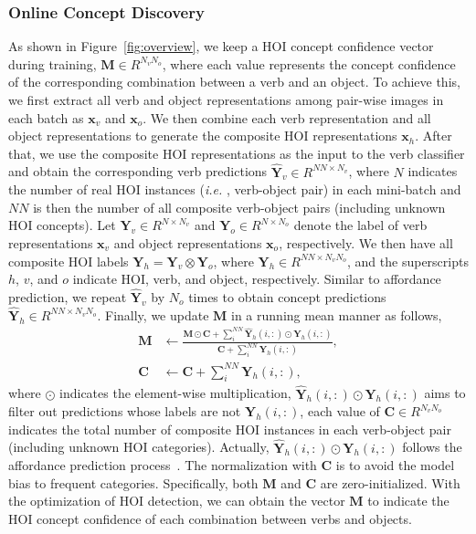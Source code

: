 \documentclass[runningheads]{llncs}
\newcommand{\ie}{\textit{i.e. }}
\begin{document}
\subsubsection{Online Concept Discovery}
 As shown in Figure~\ref{fig:overview}, we keep a HOI concept confidence vector during training, $\mathbf{M} \in R^{N_vN_o}$, where each value represents the concept confidence of the corresponding combination between a verb and an object. To achieve this, we first extract all verb and object representations among pair-wise images in each batch as $\mathbf{x}_v$ and $\mathbf{x}_o$. We then combine each verb representation and all object representations to generate the composite HOI representations $\mathbf{x}_{h}$. After that, we use the composite HOI representations as the input to the verb classifier and obtain the corresponding verb predictions $\mathbf{\hat{Y}}_v\in R^{NN\times N_v}$, where $N$ indicates the number of real HOI instances (\ie, verb-object pair) in each mini-batch and $NN$ is then the number of all composite verb-object pairs (including unknown HOI concepts). Let $\mathbf{Y}_v \in R^{N \times N_v}$ and $\mathbf{Y}_o \in R^{N \times N_o}$ denote the label of verb representations $\mathbf{x}_v$ and object representations $\mathbf{x}_o$, respectively. We then have all composite HOI labels $\mathbf{Y}_{h} = \mathbf{Y}_v \otimes \mathbf{Y}_o$, where $\mathbf{Y}_{h} \in R^{ N N\times N_v N_o}$, and the superscripts $h$, $v$, and $o$ indicate HOI, verb, and object, respectively. Similar to affordance prediction, we repeat $\mathbf{\hat{Y}}_v$ by $N_o$ times to obtain concept predictions $\mathbf{\hat{Y}}_{h} \in R^{N N \times N_v N_o}$. Finally, we update $\mathbf{M}$ in a running mean manner \cite{ioffe2015batch} as follows,
\begin{align}
    \mathbf{M} &\leftarrow \frac{\mathbf{M} \odot \mathbf{C} + \sum_{i}^{NN}{\mathbf{\hat{Y}}_{h}(i,:) \odot \mathbf{Y}_{h}(i,:)}}{\mathbf{C}+\sum_{i}^{NN}{\mathbf{Y}_{h}(i,:)}}, \\
    \mathbf{C} &\leftarrow \mathbf{C} + \sum_{i}^{NN}{\mathbf{Y}_{h}(i,:)},
\end{align}
where $\odot$ indicates the element-wise multiplication, $\mathbf{\hat{Y}}_{h}(i,:) \odot \mathbf{Y}_{h}(i,:)$ aims to filter out predictions whose labels are not $\mathbf{Y}_{h}(i,:)$, each value of $\mathbf{C} \in R^{N_v N_o}$ indicates the total number of composite HOI instances in each verb-object pair (including unknown HOI categories). Actually, $\mathbf{\hat{Y}}_{h}(i,:) \odot \mathbf{Y}_{h}(i,:)$ follows the affordance prediction process~\cite{hou2021atl}. The normalization with $\mathbf{C}$ is to avoid the model bias to frequent categories. Specifically, both $\mathbf{M}$ and $\mathbf{C}$ are zero-initialized. With the optimization of HOI detection, we can obtain the vector $\mathbf{M}$ to indicate the HOI concept confidence of each combination between verbs and objects.
\end{document}
